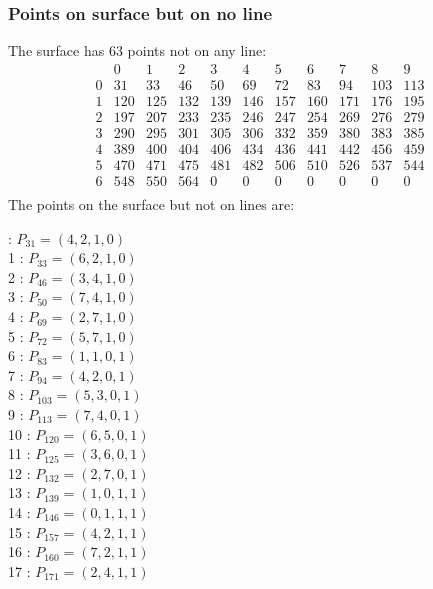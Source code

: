 \documentclass{article}
\begin{document}
{\subsubsection*{Points on surface but on no line}
The surface has 63 points not on any line:\\
$$
\begin{array}{r|*{10}{r}}
 & 0 & 1 & 2 & 3 & 4 & 5 & 6 & 7 & 8 & 9\\
\hline
0 & 31 & 33 & 46 & 50 & 69 & 72 & 83 & 94 & 103 & 113\\
1 & 120 & 125 & 132 & 139 & 146 & 157 & 160 & 171 & 176 & 195\\
2 & 197 & 207 & 233 & 235 & 246 & 247 & 254 & 269 & 276 & 279\\
3 & 290 & 295 & 301 & 305 & 306 & 332 & 359 & 380 & 383 & 385\\
4 & 389 & 400 & 404 & 406 & 434 & 436 & 441 & 442 & 456 & 459\\
5 & 470 & 471 & 475 & 481 & 482 & 506 & 510 & 526 & 537 & 544\\
6 & 548 & 550 & 564 & 0 & 0 & 0 & 0 & 0 & 0 & 0\\
\end{array}
$$
The points on the surface but not on lines are:\\
\begin{multicols}{2}
 : $P_{31}=( 4, 2, 1, 0 )$\\
1 : $P_{33}=( 6, 2, 1, 0 )$\\
2 : $P_{46}=( 3, 4, 1, 0 )$\\
3 : $P_{50}=( 7, 4, 1, 0 )$\\
4 : $P_{69}=( 2, 7, 1, 0 )$\\
5 : $P_{72}=( 5, 7, 1, 0 )$\\
6 : $P_{83}=( 1, 1, 0, 1 )$\\
7 : $P_{94}=( 4, 2, 0, 1 )$\\
8 : $P_{103}=( 5, 3, 0, 1 )$\\
9 : $P_{113}=( 7, 4, 0, 1 )$\\
10 : $P_{120}=( 6, 5, 0, 1 )$\\
11 : $P_{125}=( 3, 6, 0, 1 )$\\
12 : $P_{132}=( 2, 7, 0, 1 )$\\
13 : $P_{139}=( 1, 0, 1, 1 )$\\
14 : $P_{146}=( 0, 1, 1, 1 )$\\
15 : $P_{157}=( 4, 2, 1, 1 )$\\
16 : $P_{160}=( 7, 2, 1, 1 )$\\
17 : $P_{171}=( 2, 4, 1, 1 )$\\

\end{multicols}}
\end{document}
